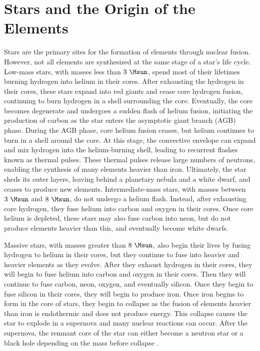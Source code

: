 \section{Stars and the Origin of the Elements}

Stars are the primary sites for the formation of elements through nuclear fusion.
However, not all elements are synthesized at the same stage of a star's life cycle.
Low-mass stars, with masses less than $3~\Msun$, spend most of their lifetimes burning hydrogen into helium in their cores.
After exhausting the hydrogen in their cores, these stars expand into red giants and cease core hydrogen fusion, continuing to burn hydrogen in a shell surrounding the core.
Eventually, the core becomes degenerate and undergoes a sudden flash of helium fusion, initiating the production of carbon as the star enters the asymptotic giant branch (AGB) phase.
During the AGB phase, core helium fusion ceases, but helium continues to burn in a shell around the core.
At this stage, the convective envelope can expand and mix hydrogen into the helium-burning shell, leading to recurrent flashes known as thermal pulses.
These thermal pulses release large numbers of neutrons, enabling the synthesis of many elements heavier than iron.
Ultimately, the star sheds its outer layers, leaving behind a planetary nebula and a white dwarf, and ceases to produce new elements.
Intermediate-mass stars, with masses between $3~\Msun$ and $8~\Msun$, do not undergo a helium flash.
Instead, after exhausting core hydrogen, they fuse helium into carbon and oxygen in their cores.
Once core helium is depleted, these stars may also fuse carbon into neon, but do not produce elements heavier than this, and eventually become white dwarfs.
\citep{prialnikIntroductionTheoryStellar2009, herwigEvolutionSolarIntermediateMass2013}

Massive stars, with masses greater than $8~\Msun$, also begin their lives by fusing hydrogen to helium in their cores, but they continue to fuse into heavier and heavier elements as they evolve. 
After they exhaust hydrogen in their cores, they will begin to fuse helium into carbon and oxygen in their cores.
Then they will continue to fuse carbon, neon, oxygen, and eventually silicon.
Once they begin to fuse silicon in their cores, they will begin to produce iron. 
Once iron begins to form in the core of stars, they begin to collapse as the fusion of elements heavier than iron is endothermic and does not produce energy.
This collapse causes the star to explode in a supernova and many nuclear reactions can occur.
After the supernova, the remnant core of the star can either become a neutron star or a black hole depending on the mass before collapse \citep{woosleyEvolutionExplosionMassive2002,prialnikIntroductionTheoryStellar2009}.

